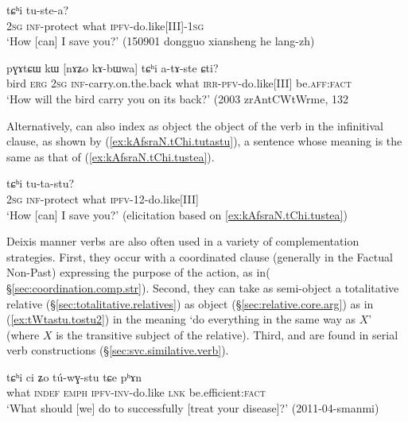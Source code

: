  \begin{exe}
\ex \label{ex:kAfsraN.tChi.tustea}
 tɕʰi tu-ste-a? \\
\textsc{2sg} \textsc{inf}-protect what \textsc{ipfv}-do.like[III]-\textsc{1sg} \\
\glt `How [can] I save you?' (150901 dongguo xiansheng he lang-zh)
\end{exe} 

 \begin{exe}
\ex \label{ex:kAbWwa.tChi.atAste}
\gll pɣɤtɕɯ kɯ [nɤʑo kɤ-bɯwa] tɕʰi a-tɤ-ste ɕti? \\
bird \textsc{erg} \textsc{2sg} \textsc{inf}-carry.on.the.back what \textsc{irr}-\textsc{pfv}-do.like[III] be.\textsc{aff}:\textsc{fact} \\
\glt `How will the bird carry you on its back?' (2003 zrAntCWtWrme, 132
\end{exe} 


Alternatively,  can also index as object the object of the verb in the infinitival clause, as shown by (\ref{ex:kAfsraN.tChi.tutastu}), a sentence whose meaning is the same as that of (\ref{ex:kAfsraN.tChi.tustea}).

 \begin{exe}
\ex \label{ex:kAfsraN.tChi.tutastu}
 tɕʰi tu-ta-stu? \\
\textsc{2sg} \textsc{inf}-protect what \textsc{ipfv}-1\fl{}2-do.like[III]  \\
\glt `How [can] I save you?' (elicitation based on \ref{ex:kAfsraN.tChi.tustea})
\end{exe} 

Deixis manner verbs are also often used in a variety of complementation strategies. First, they occur with a coordinated clause (generally in the Factual Non-Past) expressing the purpose of the action, as in( §\ref{sec:coordination.comp.str}). Second, they can take as semi-object a totalitative relative (§\ref{sec:totalitative.relatives}) as object (§\ref{sec:relative.core.arg}) as in (\ref{ex:tWtastu.tostu2}) in the meaning `do everything in the same way as $X$' (where $X$ is the transitive subject of the relative). Third,  and  are found in serial verb constructions (§\ref{sec:svc.similative.verb}).

 \begin{exe}
\ex \label{ex:tChi.tuwGstu}
\gll tɕʰi ci ʑo tú-wɣ-stu tɕe pʰɤn \\
what \textsc{indef} \textsc{emph} \textsc{ipfv}-\textsc{inv}-do.like \textsc{lnk} be.efficient:\textsc{fact} \\
\glt `What should [we] do to successfully [treat your disease]?' (2011-04-smanmi)
\end{exe} 

